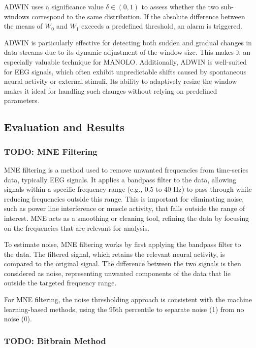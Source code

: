 ADWIN uses a significance value \(\delta \in (0,1)\) to assess whether the two sub-windows correspond to the same distribution. If the absolute difference between the means of $W_0$ and $W_1$ exceeds a predefined threshold, an alarm is triggered. 

ADWIN is particularly effective for detecting both sudden and gradual changes in data streams due to its dynamic adjustment of the window size. This makes it an especially valuable technique for MANOLO. Additionally, ADWIN is well-suited for EEG signals, which often exhibit unpredictable shifts caused by spontaneous neural activity or external stimuli. Its ability to adaptively resize the window makes it ideal for handling such changes without relying on predefined parameters.

\subsection{Evaluation and Results}

\subsubsection{TODO: MNE Filtering}

MNE filtering is a method used to remove unwanted frequencies from time-series data, typically EEG signals. It applies a bandpass filter to the data, allowing signals within a specific frequency range (e.g., 0.5 to 40 Hz) to pass through while reducing frequencies outside this range. This is important for eliminating noise, such as power line interference or muscle activity, that falls outside the range of interest. MNE acts as a smoothing or cleaning tool, refining the data by focusing on the frequencies that are relevant for analysis.

To estimate noise, MNE filtering works by first applying the bandpass filter to the data. The filtered signal, which retains the relevant neural activity, is compared to the original signal. The difference between the two signals is then considered as noise, representing unwanted components of the data that lie outside the targeted frequency range.

For MNE filtering, the noise thresholding approach is consistent with the machine learning-based methods, using the 95th percentile to separate noise (1) from no noise (0).

\subsubsection{TODO: Bitbrain Method}















